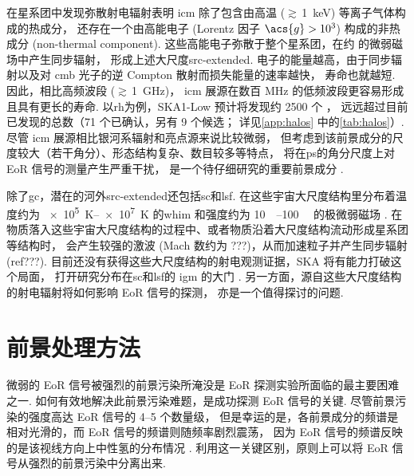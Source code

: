 在星系团中发现弥散射电辐射表明
\ac{icm} 除了包含由高温 ($\gtrsim$\,\SI{1}{\keV}) 等离子气体构成的热成分，
还存在一个由高能电子 (Lorentz 因子 $\acs{g} > \num{e3}$) 构成的非热成分
(non-thermal component).
这些高能电子弥散于整个星系团，在约 \si{\uG} 的微弱磁场中产生同步辐射，
形成上述大尺度\ac{src-extended}.
电子的能量越高，由于同步辐射以及对 \ac{cmb} 光子的逆 Compton 散射而损失能量的速率越快，
寿命也就越短.
因此，相比高频波段 ($\gtrsim$\,\SI{1}{\GHz})，
\ac{icm} 展源在数百 MHz 的低频波段更容易形成且具有更长的寿命.
以\ac{rh}为例，SKA1-Low 预计将发现约 2500 个 \cite{cassano2015}，
远远超过目前已发现的总数（71 个已确认，另有 9 个候选；
详见\autoref{app:halos} 中的\autoref{tab:halos}）.
尽管 \ac{icm} 展源相比银河系辐射和亮点源来说比较微弱，
但考虑到该前景成分的尺度较大（若干角分）、形态结构复杂、数目较多等特点，
将在\ac{ps}的角分尺度上对 EoR 信号的测量产生严重干扰，
是一个待仔细研究的重要前景成分 \cite{diMatteo2004,gleser2008}.

除了\ac{gc}，潜在的河外\ac{src-extended}还包括\ac{sc}和\ac{lsf}.
在这些宇宙大尺度结构里分布着温度约为 \SIrange{e5}{e7}{\kelvin} 的\ac{whim}
和强度约为 \SIrange{10}{100}{\nano\gauss} 的极微弱磁场 \cite{vazza2015}.
在物质落入这些宇宙大尺度结构的过程中、或者物质沿着大尺度结构流动形成星系团等结构时，
会产生较强的激波 (Mach 数约为 ???)，从而加速粒子并产生同步辐射 (ref???).
目前还没有获得这些大尺度结构的射电观测证据，SKA 将有能力打破这个局面，
打开研究分布在\ac{sc}和\ac{lsf}的 \ac{igm} 的大门 \cite{vazza2015}.
另一方面，源自这些大尺度结构的射电辐射将如何影响 EoR 信号的探测，
亦是一个值得探讨的问题.


\section{前景处理方法}
\label{sec:fg-methods}

微弱的 EoR 信号被强烈的前景污染所淹没是 EoR 探测实验所面临的最主要困难之一.
如何有效地解决此前景污染难题，是成功探测 EoR 信号的关键.
尽管前景污染的强度高达 EoR 信号的 \numrange{4}{5} 个数量级，
但是幸运的是，各前景成分的频谱是相对光滑的，而 EoR 信号的频谱则随频率剧烈震荡，
因为 EoR 信号的频谱反映的是该视线方向上中性氢的分布情况
\cite{diMatteo2002,oh2003,gnedin2004}.
利用这一关键区别，原则上可以将 EoR 信号从强烈的前景污染中分离出来.

